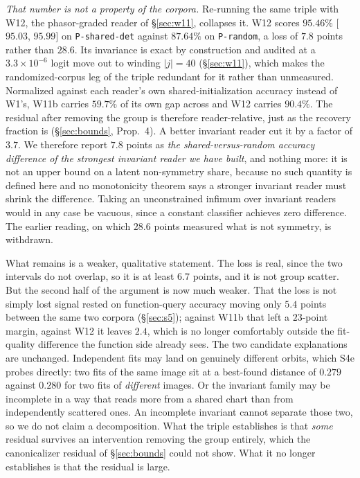 \documentclass[10pt,twocolumn,letterpaper]{article}
\theoremstyle{definition}
\begin{document}
\emph{That number is not a property of the corpora.} Re-running the same triple with W12, the
phasor-graded reader of \S\ref{sec:w11}, collapses it. W12 scores $95.46\%$ [$95.03$, $95.99$] on
\texttt{P-shared-det} against $87.64\%$ on \texttt{P-random}, a loss of $7.8$ points rather than
$28.6$. Its invariance is exact by construction and audited at a $3.3\times10^{-6}$ logit move out
to winding $|j|=40$ (\S\ref{sec:w11}), which makes the randomized-corpus leg of the triple
redundant for it rather than unmeasured. Normalized against each reader's own shared-initialization
accuracy instead of W1's, W11b carries $59.7\%$ of its own gap across and W12 carries $90.4\%$. The
residual after removing the group is therefore reader-relative, just as the recovery fraction is
(\S\ref{sec:bounds}, Prop.~4). A better invariant reader cut it by a factor of $3.7$. We therefore
report $7.8$ points as \emph{the shared-versus-random accuracy difference of the strongest
invariant reader we have built}, and nothing more: it is not an upper bound on a latent
non-symmetry share, because no such quantity is defined here and no monotonicity theorem says a
stronger invariant reader must shrink the difference. Taking an unconstrained infimum over
invariant readers would in any case be vacuous, since a constant classifier achieves zero
difference. The earlier reading, on which $28.6$ points measured what is not symmetry, is
withdrawn.

What remains is a weaker, qualitative statement. The loss is real, since the two intervals do
not overlap, so it is at least $6.7$ points, and it is not group scatter. But the second half of the
argument is now much weaker. That the loss is not simply lost signal rested on function-query accuracy
moving only $5.4$ points between the same two corpora (\S\ref{sec:s5}); against W11b that left a
$23$-point margin, against W12 it leaves $2.4$, which is no longer comfortably outside the
fit-quality difference the function side already sees. The two candidate explanations are unchanged. Independent fits may land on genuinely different
orbits, which S4e probes directly: two fits of the same image sit at a best-found distance of $0.279$
against $0.280$ for two fits of \emph{different} images. Or the invariant family may be incomplete
in a way that reads more from a shared chart than from independently scattered ones. An incomplete invariant cannot separate those two, so we do not claim a decomposition. What the triple establishes is that \emph{some} residual survives an intervention removing the
group entirely, which the canonicalizer residual of \S\ref{sec:bounds} could not show. What it no
longer establishes is that the residual is large.
\end{document}
